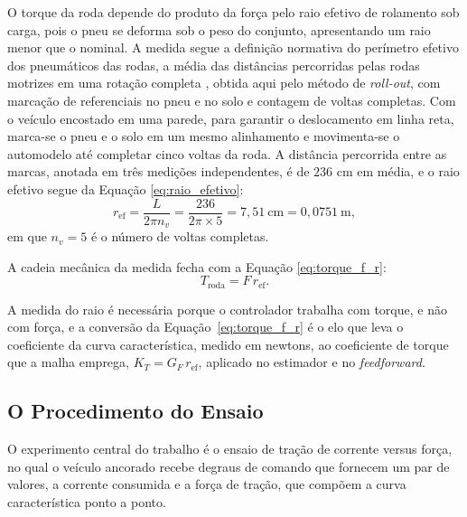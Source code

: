 O torque da roda depende do produto da força pelo raio efetivo de rolamento sob carga, pois o
pneu se deforma sob o peso do conjunto, apresentando um raio menor que o nominal. A medida
segue a definição normativa do perímetro efetivo dos pneumáticos das rodas, a média das
distâncias percorridas pelas rodas motrizes em uma rotação completa
\cite{cee3821_85}, obtida aqui pelo método de \emph{roll-out}, com marcação de
referenciais no pneu e no solo e contagem de voltas completas. Com o veículo encostado em uma parede, para garantir o
deslocamento em linha reta, marca-se o pneu e o solo em um mesmo alinhamento e
movimenta-se o automodelo até completar cinco voltas da roda. A distância percorrida entre
as marcas, anotada em três medições independentes, é de $236$ cm em média, e o raio
efetivo segue da Equação \eqref{eq:raio_efetivo}:
\begin{equation}\label{eq:raio_efetivo}
r_\mathrm{ef} = \frac{L}{2\pi n_v}
              = \frac{236}{2\pi \times 5}
              = 7{,}51\ \mathrm{cm}
              = 0{,}0751\ \mathrm{m},
\end{equation}
em que $n_v = 5$ é o número de voltas completas.

A cadeia mecânica da medida fecha com a Equação \eqref{eq:torque_f_r}:
\begin{equation}\label{eq:torque_f_r}
T_\mathrm{roda} = F\,r_\mathrm{ef}.
\end{equation}

A medida do raio é necessária porque o controlador trabalha com torque, e não com força, e a
conversão da Equação~\eqref{eq:torque_f_r} é o elo que leva o coeficiente da
curva característica, medido em newtons, ao coeficiente de torque que a malha emprega,
$K_T = G_F\,r_\mathrm{ef}$, aplicado no estimador e no \emph{feedforward}.

\subsection{O Procedimento do Ensaio}
\label{sec:procedimentotracao}

O experimento central do trabalho é o ensaio de tração de corrente versus força, no qual o
veículo ancorado recebe degraus de comando que fornecem um par de valores, a corrente
consumida e a força de tração, que compõem a curva característica ponto a ponto.

